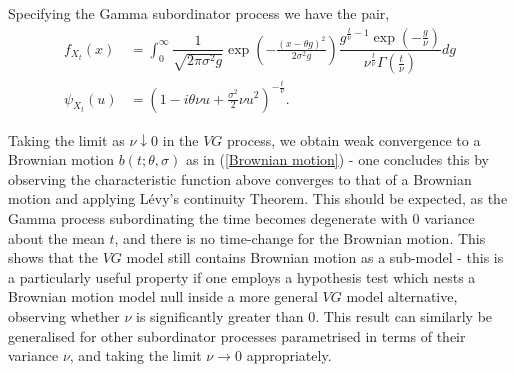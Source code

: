 \documentclass{article}
\begin{document}
\begin{example}

Specifying the Gamma subordinator process we have the pair,
\begin{align}
    f_{X_t}(x) &= \int_{0}^\infty\dfrac{1}{\sqrt{2\pi\sigma^2g}}\exp\left(-\frac{(x-\theta g)^2}{2\sigma^2g}\right)\dfrac{g^{\frac{t}{\nu}-1}\exp\left(-\frac{g}{\nu}\right)}{\nu^{\frac{t}{\nu}}\Gamma\left(\frac{t}{\nu}\right)}dg\\
    \psi_{X_t}(u) &= \left({1-i\theta\nu u + \frac{\sigma^2}{2}\nu u^2}\right)^{-\frac{t}{\nu}}.
\end{align}

Taking the limit as $\nu\downarrow0$ in the $VG$ process, we obtain weak convergence to a Brownian motion $b(t;\theta,\sigma)$ as in (\ref{Brownian motion}) - one concludes this by observing the characteristic function above converges to that of a Brownian motion and applying Lévy's continuity Theorem. This should be expected, as the Gamma process subordinating the time becomes degenerate with $0$ variance about the mean $t$, and there is no time-change for the Brownian motion. This shows that the $VG$ model still contains Brownian motion as a sub-model - this is a particularly useful property if one employs a hypothesis test which nests a Brownian motion model null inside a more general $VG$ model alternative, observing whether $\nu$ is significantly greater than $0$. This result can similarly be generalised for other subordinator processes parametrised in terms of their variance $\nu$, and taking the limit $\nu\to 0$ appropriately.


\end{example}
\end{document}
